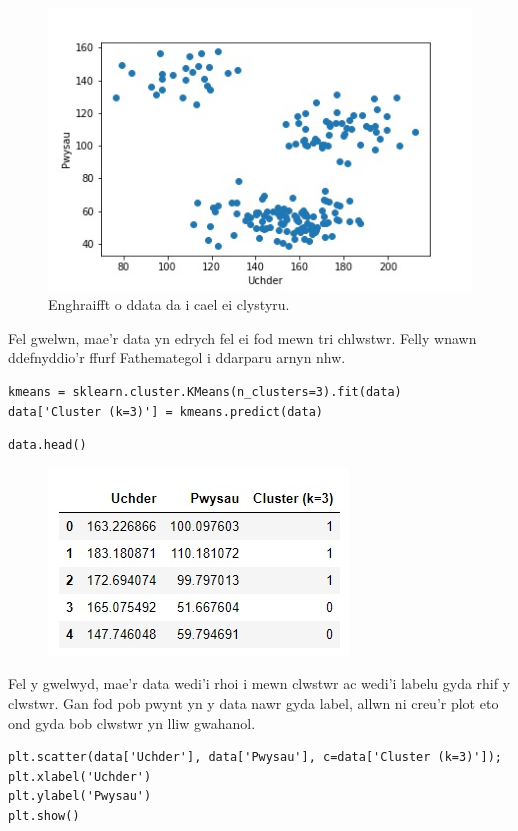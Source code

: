 \begin{figure}[H]
\begin{center}
\includegraphics[width=0.7\linewidth]{../img/Scatterpython.jpeg}
\caption{Enghraifft o ddata da i cael ei clystyru.}
\label{fig:Scatterpython}
\end{center}
\end{figure}

Fel gwelwn, mae'r data yn edrych fel ei fod mewn tri chlwstwr. Felly wnawn ddefnyddio'r ffurf Fathemategol i ddarparu arnyn nhw.

\begin{verbatim}
kmeans = sklearn.cluster.KMeans(n_clusters=3).fit(data)
data['Cluster (k=3)'] = kmeans.predict(data)
\end{verbatim}



\begin{verbatim}
data.head()
\end{verbatim}

\begin{figure}[H]
\includegraphics[width=0.35\linewidth]{../img/tabl2.jpg}
\label{fig:Data2}
\end{figure}

Fel y gwelwyd, mae'r data wedi'i rhoi i mewn clwstwr ac wedi'i labelu gyda rhif y clwstwr. Gan fod pob pwynt yn y data nawr gyda label, allwn ni creu'r plot eto ond gyda bob clwstwr yn lliw gwahanol.

\begin{verbatim}
plt.scatter(data['Uchder'], data['Pwysau'], c=data['Cluster (k=3)']);
plt.xlabel('Uchder')
plt.ylabel('Pwysau')
plt.show()
\end{verbatim}

